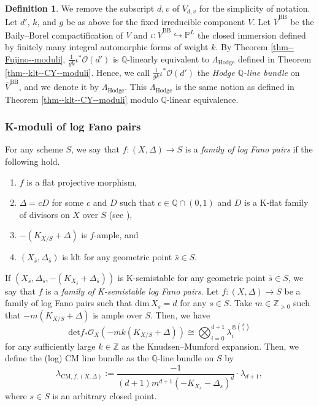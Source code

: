 \documentclass[12pt,twoside]{amsart}
\theoremstyle{definition}
\newtheorem{defn}[thm]{Definition}
\begin{document}
\begin{defn}\label{defn--Hodge-Q-line-bundle}
We remove the subscript $d,v$ of $V_{d,v}$ for the simplicity of notation. 
    Let $d'$, $k$, and $g$ be as above for the fixed irreducible component $V$.
Let $\overline{V}^{\mathrm{BB}}$ be the Baily--Borel compactification of $V$ and $\iota\colon\overline{V}^{\mathrm{BB}} \hookrightarrow\mathbb{P}^L$ the closed immersion defined by finitely many integral automorphic forms of weight $k$. 
By Theorem \ref{thm--Fujino--moduli}, $\frac{1}{gk}\iota^*\mathcal{O}(d')$ is $\mathbb{Q}$-linearly equivalent to $\Lambda_{\mathrm{Hodge}}$ defined in Theorem \ref{thm--klt--CY--moduli}. 
Hence, we call $\frac{1}{gk}\iota^*\mathcal{O}(d')$ the {\it Hodge $\mathbb{Q}$-line bundle} on $\overline{V}^{\mathrm{BB}}$, and we denote it by $\Lambda_{\mathrm{Hodge}}$. 
This $\Lambda_{\mathrm{Hodge}}$ is the same notion as defined in Theorem \ref{thm--klt--CY--moduli} modulo $\mathbb{Q}$-linear equivalence.
\end{defn}

\subsubsection{K-moduli of log Fano pairs}

For any scheme $S$, we say that $f\colon (X,\Delta)\to S$ is a {\em family of log Fano pairs} if the following hold.
\begin{enumerate}
\item $f$ is a flat projective morphism,
    \item $\Delta=cD$ for some $c$ and $D$ such that $c\in\mathbb{Q}\cap(0,1)$ and $D$ is a K-flat family of divisors on $X$ over $S$ (see \cite[Definition 7.1]{kollar-moduli}),
    \item $-(K_{X/S}+\Delta)$ is $f$-ample, and 
    \item $(X_{\bar{s}},\Delta_{\bar{s}})$ is klt for any geometric point $\bar{s}\in S$.
\end{enumerate}
If $(X_{\bar{s}},\Delta_{\bar{s}},-(K_{X_{\bar{s}}}+\Delta_{\bar{s}}))$ is K-semistable for any geometric point $\bar{s}\in S$, we say that $f$ is a {\em family of K-semistable log Fano pairs}.
Let $f\colon (X,\Delta)\to S$ be a family of log Fano pairs such that $\mathrm{dim}\,X_{s}=d$ for any $s\in S$.
Take $m\in\mathbb{Z}_{>0}$ such that $-m(K_{X/S}+\Delta)$ is ample over $S$.
Then, we have
\[
\mathrm{det}f_*\mathcal{O}_{X}(-mk(K_{X/S}+\Delta))\cong\bigotimes_{i=0}^{d+1}\lambda_i^{\otimes\binom{k}{i}}
\]
for any sufficiently large $k\in\mathbb{Z}$ as the Knudsen--Mumford expansion.
Then, we define the (log) CM line bundle as the $\mathbb{Q}$-line bundle on $S$ by
\[
\lambda_{\mathrm{CM},f, (X,\Delta)}:=\frac{-1}{(d+1)m^{d+1}(-K_{X_s}-\Delta_s)^d}\cdot \lambda_{d+1},
\]
where $s\in S$ is an arbitrary closed point.
\end{document}
